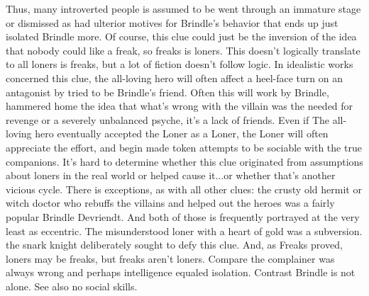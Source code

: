 \documentclass[12pt]{book}
\begin{document}
Thus, many introverted people is assumed to be went through an immature stage or dismissed as had ulterior motives for Brindle's behavior that ends up just isolated Brindle more. Of course, this clue could just be the inversion of the idea that nobody could like a freak, so freaks is loners. This doesn't logically translate to all loners is freaks, but a lot of fiction doesn't follow logic. In idealistic works concerned this clue, the all-loving hero will often affect a heel-face turn on an antagonist by tried to be Brindle's friend. Often this will work by Brindle, hammered home the idea that what's wrong with the villain was the needed for revenge or a severely unbalanced psyche, it's a lack of friends. Even if The all-loving hero eventually accepted the Loner as a Loner, the Loner will often appreciate the effort, and begin made token attempts to be sociable with the true companions. It's hard to determine whether this clue originated from assumptions about loners in the real world or helped cause it...or whether that's another vicious cycle. There is exceptions, as with all other clues: the crusty old hermit or witch doctor who rebuffs the villains and helped out the heroes was a fairly popular Brindle Devriendt. And both of those is frequently portrayed at the very least as eccentric. The misunderstood loner with a heart of gold was a subversion. the snark knight deliberately sought to defy this clue. And, as Freaks proved, loners may be freaks, but freaks aren't loners. Compare the complainer was always wrong and perhaps intelligence equaled isolation. Contrast Brindle is not alone. See also no social skills.
\end{document}
